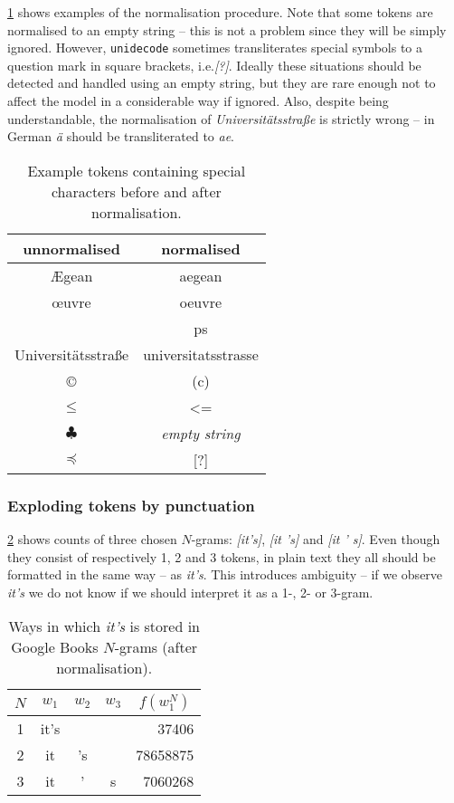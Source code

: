 \documentclass[draft]{IIBproject}
\makeatletter
\newcommand*{\ie}{i.e.\@\xspace}
\DeclareRobustCommand{\ngram}[1]{\emph{[#1]}}
\makeatother
\begin{document}
\cref{tab:normalisation_examples} shows examples of the normalisation procedure. Note that some tokens are normalised to an empty string -- this is not a problem since they will be simply ignored. However, \texttt{unidecode} sometimes transliterates special symbols to a question mark in square brackets, \ie \emph{[?]}. Ideally these situations should be detected and handled using an empty string, but they are rare enough not to affect the model in a considerable way if ignored. Also, despite being understandable, the normalisation of \emph{Universitätsstraße} is strictly wrong -- in German \emph{ä} should be transliterated to \emph{ae}\cite{standard:din5007v2}.

\begin{table}[h]
	\centering
	\begin{tabular}{c | c}
	unnormalised & normalised \\
	\hline
	Ægean & aegean \\
	œuvre & oeuvre \\
	\textsterling & ps \\
	Universitätsstraße & universitatsstrasse \\
	\copyright & (c) \\
	$\leq$ & \textless= \\
	$\clubsuit$ & \emph{empty string} \\
	$\preccurlyeq$ & [?]
	\end{tabular}
	\caption{\label{tab:normalisation_examples}Example tokens containing special characters before and after normalisation.}
\end{table}

\subsubsection{Exploding tokens by punctuation}
\label{sec:exploding_tokens}

\cref{tab:its_ngrams} shows counts of three chosen $N$-grams: \ngram{it's}, \ngram{it 's} and \ngram{it ' s}. Even though they consist of respectively 1, 2 and 3 tokens, in plain text they all should be formatted in the same way -- as \emph{it's}. This introduces ambiguity -- if we observe \emph{it's} we do not know if we should interpret it as a 1-, 2- or 3-gram.

\begin{table}[h]
	\centering
	\begin{tabular}{c | c | c | c | r}
	$N$ & $w_1$ & $w_2$ & $w_3$ & \multicolumn{1}{c}{$f(w_1^N)$} \\
	\hline
	1 & it's & & & \num{37406} \\
	2 & it & 's & & \num{78658875} \\
	3 & it & ' & s & \num{7060268}
	\end{tabular}
	\caption{\label{tab:its_ngrams}Ways in which \emph{it's} is stored in Google Books $N$-grams (after normalisation).}
\end{table}
\end{document}
